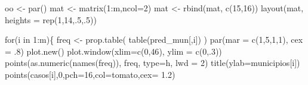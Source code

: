 \documentclass[
  letterpaper,
  DIV=11,
  numbers=noendperiod]{scrreprt}
\newenvironment{Shaded}{\begin{snugshade}}{\end{snugshade}}
\newcommand{\AttributeTok}[1]{\textcolor[rgb]{0.40,0.45,0.13}{#1}}
\newcommand{\ControlFlowTok}[1]{\textcolor[rgb]{0.00,0.23,0.31}{#1}}
\newcommand{\DecValTok}[1]{\textcolor[rgb]{0.68,0.00,0.00}{#1}}
\newcommand{\FloatTok}[1]{\textcolor[rgb]{0.68,0.00,0.00}{#1}}
\newcommand{\FunctionTok}[1]{\textcolor[rgb]{0.28,0.35,0.67}{#1}}
\newcommand{\NormalTok}[1]{\textcolor[rgb]{0.00,0.23,0.31}{#1}}
\newcommand{\OtherTok}[1]{\textcolor[rgb]{0.00,0.23,0.31}{#1}}
\newcommand{\SpecialCharTok}[1]{\textcolor[rgb]{0.37,0.37,0.37}{#1}}
\newcommand{\StringTok}[1]{\textcolor[rgb]{0.13,0.47,0.30}{#1}}
\theoremstyle{definition}
\theoremstyle{definition}
\theoremstyle{remark}
\begin{document}
\begin{Shaded}
\begin{Highlighting}[]
\NormalTok{oo }\OtherTok{\textless{}{-}} \FunctionTok{par}\NormalTok{()}
\NormalTok{mat }\OtherTok{\textless{}{-}} \FunctionTok{matrix}\NormalTok{(}\DecValTok{1}\SpecialCharTok{:}\NormalTok{m,}\AttributeTok{ncol=}\DecValTok{2}\NormalTok{)}
\NormalTok{mat }\OtherTok{\textless{}{-}} \FunctionTok{rbind}\NormalTok{(mat, }\FunctionTok{c}\NormalTok{(}\DecValTok{15}\NormalTok{,}\DecValTok{16}\NormalTok{))}
\FunctionTok{layout}\NormalTok{(mat, }\AttributeTok{heights =} \FunctionTok{rep}\NormalTok{(}\DecValTok{1}\NormalTok{,}\DecValTok{14}\NormalTok{,.}\DecValTok{5}\NormalTok{,.}\DecValTok{5}\NormalTok{))}

\ControlFlowTok{for}\NormalTok{(i }\ControlFlowTok{in} \DecValTok{1}\SpecialCharTok{:}\NormalTok{m)\{}
\NormalTok{  freq }\OtherTok{\textless{}{-}} \FunctionTok{prop.table}\NormalTok{( }\FunctionTok{table}\NormalTok{(pred\_mun[,i]) )}
  \FunctionTok{par}\NormalTok{(}\AttributeTok{mar =} \FunctionTok{c}\NormalTok{(}\DecValTok{1}\NormalTok{,}\DecValTok{5}\NormalTok{,}\DecValTok{1}\NormalTok{,}\DecValTok{1}\NormalTok{), }\AttributeTok{cex =}\NormalTok{ .}\DecValTok{8}\NormalTok{)}
  \FunctionTok{plot.new}\NormalTok{()}
  \FunctionTok{plot.window}\NormalTok{(}\AttributeTok{xlim=}\FunctionTok{c}\NormalTok{(}\DecValTok{0}\NormalTok{,}\DecValTok{46}\NormalTok{), }\AttributeTok{ylim =} \FunctionTok{c}\NormalTok{(}\DecValTok{0}\NormalTok{,.}\DecValTok{3}\NormalTok{))}
  \FunctionTok{points}\NormalTok{(}\FunctionTok{as.numeric}\NormalTok{(}\FunctionTok{names}\NormalTok{(freq)), freq, }\AttributeTok{type=}\StringTok{\textquotesingle{}h\textquotesingle{}}\NormalTok{, }\AttributeTok{lwd =} \DecValTok{2}\NormalTok{)}
  \FunctionTok{title}\NormalTok{(}\AttributeTok{ylab=}\NormalTok{municipios[i])}
  \FunctionTok{points}\NormalTok{(casos[i],}\DecValTok{0}\NormalTok{,}\AttributeTok{pch=}\DecValTok{16}\NormalTok{,}\AttributeTok{col=}\StringTok{\textquotesingle{}tomato\textquotesingle{}}\NormalTok{,}\AttributeTok{cex=} \FloatTok{1.2}\NormalTok{)}
  

\end{Highlighting}
\end{Shaded}
\end{document}
